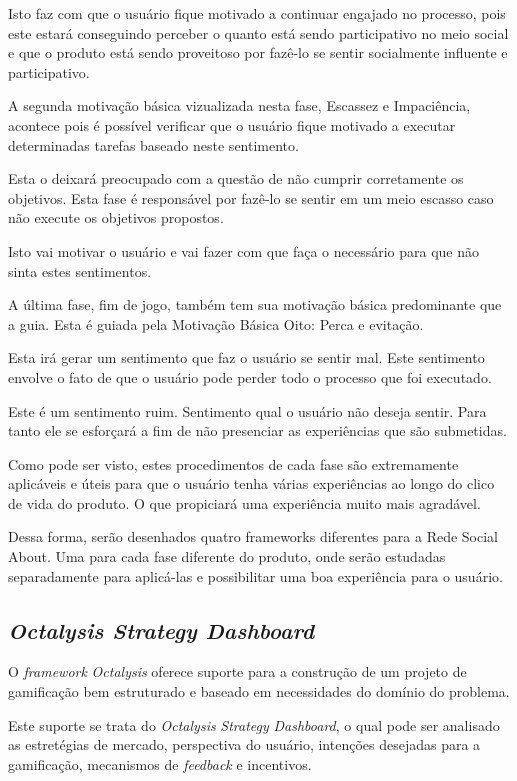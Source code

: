 Isto faz com que o usuário fique motivado a continuar engajado no processo, pois
este estará conseguindo perceber o quanto está sendo participativo no meio social
e que o produto está sendo proveitoso por fazê-lo se sentir socialmente influente
e participativo.


A segunda motivação básica vizualizada nesta fase, Escassez e Impaciência, acontece
pois é possível verificar que o usuário fique motivado a executar determinadas
tarefas baseado neste sentimento.

Esta o deixará preocupado com a questão de não cumprir corretamente os objetivos.
Esta fase é responsável por fazê-lo se sentir em um meio escasso caso não execute
os objetivos propostos.

Isto vai motivar o usuário e vai fazer com que faça o necessário para que não
sinta estes sentimentos.

A última fase, fim de jogo, também tem sua motivação básica predominante que
a guia. Esta é guiada pela Motivação Básica Oito: Perca e evitação.

Esta irá gerar um sentimento que faz o usuário se sentir mal. Este sentimento
envolve o fato de que o usuário pode perder todo o processo que foi executado.



Este é um sentimento ruim. Sentimento qual o usuário não deseja sentir. Para tanto
ele se esforçará a fim de não presenciar as experiências que são submetidas.

Como pode ser visto, estes procedimentos de cada fase são extremamente aplicáveis
e úteis para que o usuário tenha várias experiências ao longo do clico de vida do
produto. O que propiciará uma experiência muito mais agradável.

Dessa forma, serão desenhados quatro frameworks diferentes para a Rede Social About.
Uma para cada fase diferente do produto, onde serão estudadas separadamente para
aplicá-las e possibilitar uma boa experiência para o usuário.

\subsection{\textit{Octalysis Strategy Dashboard}}
\label{sec:octalysisdashborad}
O \textit{framework} \textit{Octalysis} oferece suporte para a construção de um projeto de gamificação
bem estruturado e baseado em necessidades do domínio do problema.

Este suporte se trata do \textit{Octalysis} \textit{Strategy} \textit{Dashboard}, o qual pode ser analisado
 as
estretégias de mercado, perspectiva do usuário, intenções desejadas para a gamificação,
mecanismos de \textit{feedback} e incentivos.

